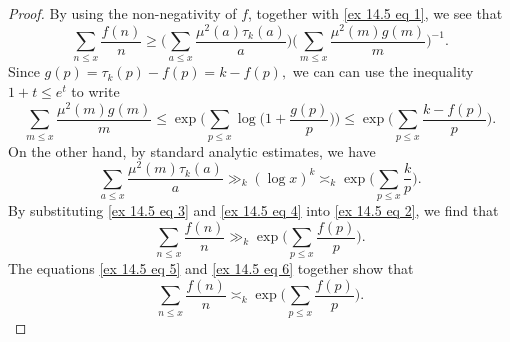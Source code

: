 \documentclass{amsart}
\theoremstyle{definition}
\numberwithin{equation}{section}
\begin{document}
\begin{proof}
		By using the non-negativity of $f$, together with \eqref{ex 14.5 eq 1}, we see that
		\begin{equation}\label{ex 14.5 eq 2}
			\sum_{n \leq x}\frac{f(n)}{n} \geq \bigg(\sum_{a \leq x} \frac{\mu^2(a) \tau_k(a)}{a}\bigg)\bigg(\sum_{m \leq x} \frac{\mu^2(m)g(m)}{m}\bigg)^{-1}.
		\end{equation}
		Since $g(p) = \tau_k(p) -f(p) = k-f(p),$ we can can use the inequality $1+t \leq e^t$ to write
		\begin{equation}\label{ex 14.5 eq 3}
			\sum_{m \leq x}\frac{\mu^2(m)g(m)}{m} \le \exp\bigg(\sum_{p \leq x}\log\Big(1+\frac{g(p)}{p}\Big)\bigg) \le  \exp\bigg(\sum_{p \leq x}\frac{k-f(p)}{p}\bigg).
		\end{equation}
		On the other hand, by standard analytic estimates, we have
		\begin{equation}\label{ex 14.5 eq 4}
			\sum_{a \leq x}\frac{\mu^2(m)\tau_k(a)}{a}  \gg_k (\log x)^k \asymp_k \exp\bigg(\sum_{p \leq x}\frac{k}{p}\bigg).
		\end{equation}
		By substituting \eqref{ex 14.5 eq 3} and \eqref{ex 14.5 eq 4} into \eqref{ex 14.5 eq 2}, we find that
		\begin{equation}\label{ex 14.5 eq 5}
			\sum_{n \leq x}\frac{f(n)}{n} \gg_k \exp\bigg(\sum_{p \leq x}\frac{f(p)}{p}\bigg).
		\end{equation}
		The equations \eqref{ex 14.5 eq 5} and \eqref{ex 14.5 eq 6} together show that
		\begin{equation}\label{ex 14.5 eq 7}
			\sum_{n \leq x}\frac{f(n)}{n} \asymp_k \exp\bigg(\sum_{p \leq x} \frac{f(p)}{p} \bigg).
		\end{equation}
		

\end{proof}
\end{document}
